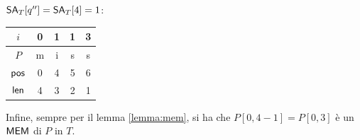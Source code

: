 \begin{esempio}
  $\mbox{\rm {\sf SA}}_T[q'']=\mbox{\rm {\sf SA}}_T[4]=1$: 
  \begin{table}[H]
    \centering
    \begin{tabular}{c||c|c|c|c}
      $i$ & 0 & 1 & 1 & 3 \\
      \hline
      $P$ & m & i & s & s \\
      \hline
      \hline
      $\mbox{\rm {\sf pos}}$ & 0 & 4 & 5 & 6\\
      \hline
      $\mbox{\rm {\sf len}}$ & 4 & 3 & 2 & 1\\
    \end{tabular}
  \end{table}
  \noindent
  Infine, sempre per il lemma \ref{lemma:mem}, si ha che $P[0,4-1]=P[0,3]$ è
  un $\mbox{\rm {\sf MEM}}$ di $P$ in $T$. 
\end{esempio}
